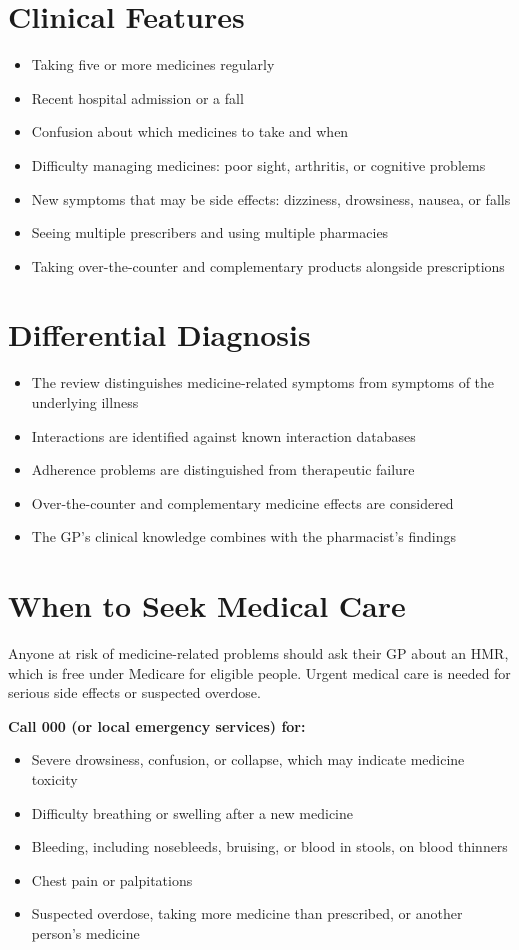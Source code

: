 \section*{Clinical Features}
\begin{itemize}
    \item Taking five or more medicines regularly
    \item Recent hospital admission or a fall
    \item Confusion about which medicines to take and when
    \item Difficulty managing medicines: poor sight, arthritis, or cognitive problems
    \item New symptoms that may be side effects: dizziness, drowsiness, nausea, or falls
    \item Seeing multiple prescribers and using multiple pharmacies
    \item Taking over-the-counter and complementary products alongside prescriptions
\end{itemize}

\section*{Differential Diagnosis}
\begin{itemize}
    \item The review distinguishes medicine-related symptoms from symptoms of the underlying illness
    \item Interactions are identified against known interaction databases
    \item Adherence problems are distinguished from therapeutic failure
    \item Over-the-counter and complementary medicine effects are considered
    \item The GP's clinical knowledge combines with the pharmacist's findings
\end{itemize}

\section*{When to Seek Medical Care}
Anyone at risk of medicine-related problems should ask their GP about an HMR, which is free under Medicare for eligible people. Urgent medical care is needed for serious side effects or suspected overdose.

\textbf{Call 000 (or local emergency services) for:}
\begin{itemize}
    \item Severe drowsiness, confusion, or collapse, which may indicate medicine toxicity
    \item Difficulty breathing or swelling after a new medicine
    \item Bleeding, including nosebleeds, bruising, or blood in stools, on blood thinners
    \item Chest pain or palpitations
    \item Suspected overdose, taking more medicine than prescribed, or another person's medicine
\end{itemize}

